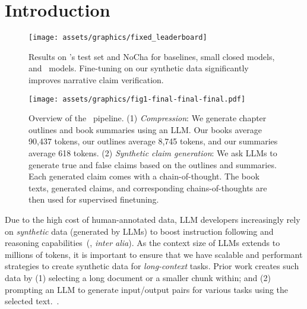 \section{Introduction}
\begin{figure}[t]
    \centering
    \texttt{[image: assets/graphics/fixed\_leaderboard]}
    \caption{Results on \pipeline's test set and NoCha for baselines, small closed models, and \pipeline\ models. Fine-tuning on our synthetic data significantly improves narrative claim verification.}
    \label{fig:leaderboard}
\end{figure}

\begin{figure*}[t]
    \centering
    \texttt{[image: assets/graphics/fig1-final-final-final.pdf]}
    \caption{Overview of the \pipeline~pipeline. (1) \textit{Compression}: We generate chapter outlines and book summaries using an LLM. Our books average 90,437 tokens, our outlines average 8,745 tokens, and our summaries average 618 tokens. (2) \textit{Synthetic claim generation}: We ask LLMs to generate true and false claims based on the outlines and summaries. Each generated claim comes with a chain-of-thought. The book texts, generated claims, and corresponding chains-of-thoughts are then used for supervised finetuning.}
    \label{fig:overview}
\end{figure*}
Due to the high cost of human-annotated data, LLM developers increasingly rely on \emph{synthetic} data (generated by LLMs) to boost instruction following and reasoning capabilities~(\citealt{ding_enhancing_2023, lambert2024tulu3, yang_qwen25-1m_2025}, \emph{inter alia}). 
As the context size of LLMs extends to millions of tokens, it is important to ensure that we have scalable and performant strategies to create synthetic data for \emph{long-context} tasks. Prior work creates such data by (1) selecting a long document or a smaller chunk within; and (2) prompting an LLM to generate input/output pairs for various tasks using the selected text.~\cite{bai_longalign_2024, dubey2024llama}. %

